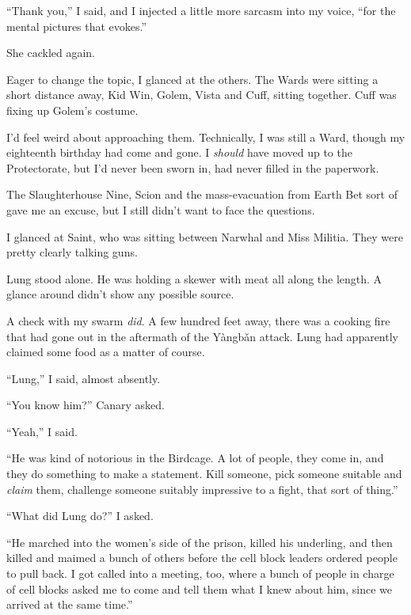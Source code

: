 ``Thank you,'' I said, and I injected a little more sarcasm into my voice, ``for the mental pictures that evokes.''



She cackled again.



Eager to change the topic, I glanced at the others.  The Wards were sitting a short distance away, Kid Win, Golem, Vista and Cuff, sitting together.  Cuff was fixing up Golem's costume.



I'd feel weird about approaching them.  Technically, I was still a Ward, though my eighteenth birthday had come and gone.  I \emph{should} have moved up to the Protectorate, but I'd never been sworn in, had never filled in the paperwork.



The Slaughterhouse Nine, Scion and the mass-evacuation from Earth Bet sort of gave me an excuse, but I still didn't want to face the questions.



I glanced at Saint, who was sitting between Narwhal and Miss Militia.  They were pretty clearly talking guns.



Lung stood alone.  He was holding a skewer with meat all along the length.  A glance around didn't show any possible source.



A check with my swarm \emph{did}.  A few hundred feet away, there was a cooking fire that had gone out in the aftermath of the Y\`{a}ngb\v{a}n attack.  Lung had apparently claimed some food as a matter of course.



``Lung,'' I said, almost absently.



``You know him?'' Canary asked.



``Yeah,'' I said.



``He was kind of notorious in the Birdcage.  A lot of people, they come in, and they do something to make a statement.  Kill someone, pick someone suitable and \emph{claim} them, challenge someone suitably impressive to a fight, that sort of thing.''



``What did Lung do?'' I asked.



``He marched into the women's side of the prison, killed his underling, and then killed and maimed a bunch of others before the cell block leaders ordered people to pull back.  I got called into a meeting, too, where a bunch of people in charge of cell blocks asked me to come and tell them what I knew about him, since we arrived at the same time.''




